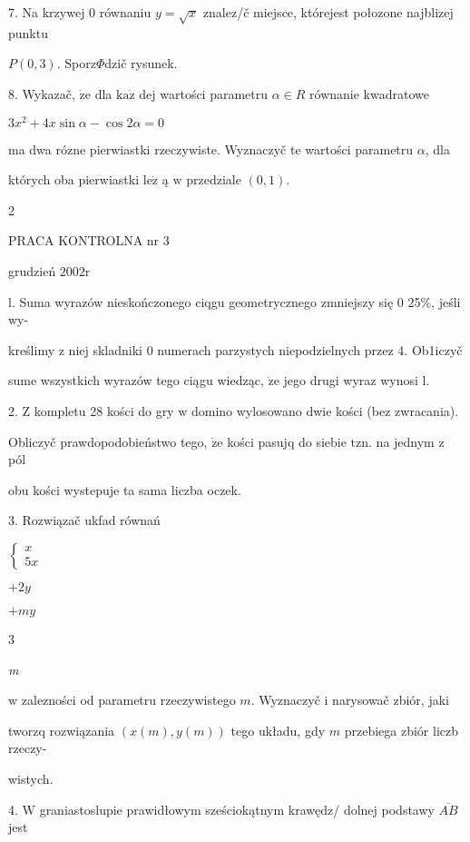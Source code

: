 \documentclass[a4paper,12pt]{article}
\begin{document}
7. Na krzywej $0$ równaniu $y=\sqrt{x}$ znalez/č miejsce, którejest połozone najblizej punktu

$P(0,3)$. Sporz$\Phi$dzič rysunek.

8. Wykazač, $\dot{\mathrm{z}}\mathrm{e}$ dla $\mathrm{k}\mathrm{a}\dot{\mathrm{z}}$ dej wartości parametru $\alpha\in R$ równanie kwadratowe

$3x^{2}+4x\sin\alpha-\cos 2\alpha=0$

ma dwa rózne pierwiastki rzeczywiste. Wyznaczyč te wartości parametru $\alpha$, dla

których oba pierwiastki $\mathrm{l}\mathrm{e}\dot{\mathrm{z}}$ ą $\mathrm{w}$ przedziale $(0,1).$

2





PRACA KONTROLNA nr 3

grudzień $2002\mathrm{r}$

l. Suma wyrazów nieskończonego ciqgu geometrycznego zmniejszy się $0$ 25\%, jeśli wy-

kreślimy $\mathrm{z}$ niej skladniki $0$ numerach parzystych niepodzielnych przez 4. Ob1iczyč

sume wszystkich wyrazów tego ciągu wiedząc, $\dot{\mathrm{z}}\mathrm{e}$ jego drugi wyraz wynosi l.

2. $\mathrm{Z}$ kompletu 28 kości do gry $\mathrm{w}$ domino wylosowano dwie kości (bez zwracania).

Obliczyč prawdopodobieństwo tego, $\dot{\mathrm{z}}\mathrm{e}$ kości pasujq do siebie $\mathrm{t}\mathrm{z}\mathrm{n}$. na jednym $\mathrm{z}$ pól

obu kości wystepuje ta sama liczba oczek.

3. Rozwiązač ukfad równań

$\left\{\begin{array}{l}
x\\
5x
\end{array}\right.$

$+2y$

$+my$

3

{\it m}

$\mathrm{w}$ zalezności od parametru rzeczywistego $m$. Wyznaczyč $\mathrm{i}$ narysowač zbiór, jaki

tworzq rozwiązania $(x(m),y(m))$ tego układu, gdy $m$ przebiega zbiór liczb rzeczy-

wistych.

4. $\mathrm{W}$ graniastoslupie prawidłowym sześciokątnym krawędz/ dolnej podstawy $\overline{AB}$ jest
\end{document}
